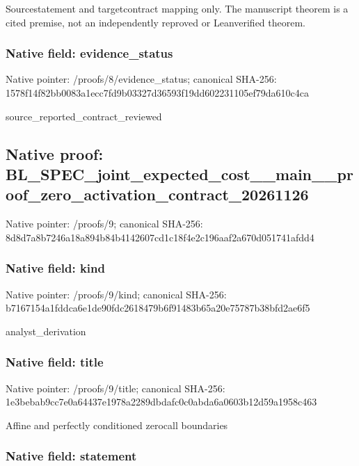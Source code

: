\documentclass[10pt,a4paper]{article}
\begin{document}
Sourcestatement and targetcontract mapping only. The manuscript theorem is a cited premise, not an independently reproved or Leanverified theorem.


\subsubsection{Native field: evidence\_status}


Native pointer: /proofs/8/evidence\_status; canonical SHA-256: 1578f14f82bb0083a1ecc7fd\allowbreak{}9b03327d36593f19dd602231\allowbreak{}105ef79da610c4ca


source\_reported\_contract\_reviewed


\subsection{Native proof: BL\_SPEC\_joint\_expected\_c\allowbreak{}ost\_\_main\_\_proof\_zero\_ac\allowbreak{}tivation\_contract\_202611\allowbreak{}26}


Native pointer: /proofs/9; canonical SHA-256: 8d8d7a8b7246a18a894b84b4\allowbreak{}142607cd1c18f4e2c196aaf2\allowbreak{}a670d051741afdd4



\subsubsection{Native field: kind}


Native pointer: /proofs/9/kind; canonical SHA-256: b7167154a1fddca6e1de90fd\allowbreak{}c2618479b6f91483b65a20e7\allowbreak{}5787b38bfd2ae6f5


analyst\_derivation


\subsubsection{Native field: title}


Native pointer: /proofs/9/title; canonical SHA-256: 1e3bebab9cc7e0a64437e197\allowbreak{}8a2289dbdafc0c0abda6a060\allowbreak{}3b12d59a1958c463


Affine and perfectly conditioned zerocall boundaries


\subsubsection{Native field: statement}
\end{document}
